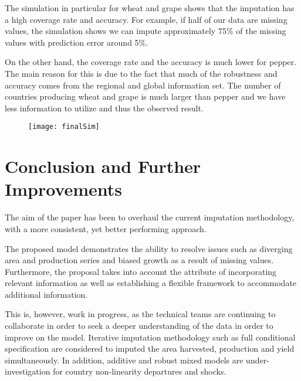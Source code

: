 \documentclass[nojss]{jss}\usepackage[]{graphicx}\usepackage[]{color}
\begin{document}
The simulation in particular for wheat and grape shows that the
imputation has a high coverage rate and accuracy. For example, if
half of our data are missing values, the simulation shows we can
impute approximately 75\% of the missing values with prediction error
around 5\%.

On the other hand, the coverage rate and the accuracy is much lower
for pepper. The main reason for this is due to the fact that much of
the robustness and accuracy comes from the regional and global
information set. The number of countries producing wheat and grape is
much larger than pepper and we have less information to utilize and
thus the observed result.


\begin{figure}[ht!]
  \centering
  \texttt{[image: finalSim]}
\end{figure}







\FloatBarrier
\section{Conclusion and Further Improvements}
The aim of the paper has been to overhaul the current imputation
methodology, with a more consistent, yet better performing approach.

The proposed model demonstrates the ability to resolve issues such as
diverging area and production series and biased growth as a result of
missing values. Furthermore, the proposal takes into account the
attribute of incorporating relevant information as well as
establishing a flexible framework to accommodate additional
information.

This is, however, work in progress, as the technical teams are
continuing to collaborate in order to seek a deeper understanding of
the data in order to improve on the model. Iterative imputation
methodology such as full conditional specification are considered to
imputed the area harvested, production and yield simultaneously.  In
addition, additive and robust mixed models are under-investigation for
country non-linearity departures and shocks.
\end{document}
